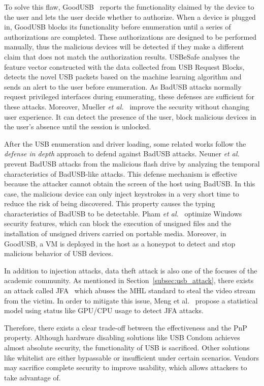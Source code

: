 To solve this flaw, GoodUSB~\cite{tian2015defending} reports the functionality claimed
by the device to the user and lets the user decide whether to authorize. When a device
is plugged in, GoodUSB blocks its functionality before enumeration until a
series of authorizations are completed. These authorizations are designed to be
performed manually, thus the malicious devices will be detected if they make a different claim 
that does not match the authorization results. 
USBeSafe\cite{usbesafe} analyses the 
feature vector constructed with the data collected from USB Request Blocks, 
detects the novel \ac{USB} packets based on the machine learning algorithm and sends 
an alert to the user before enumeration. As BadUSB attacks normally request privileged 
interfaces during enumerating, these defenses are sufficient for these attacks.
Moreover, Mueller \emph{et al.}~\cite{MuellerZN19} improve the security without changing user experience. It can detect the presence of the user, block malicious devices in the user's absence until the session is unlocked.


After the \ac{USB} enumeration and driver loading, some related works follow the \textit{defense in depth} approach to defend against BadUSB attacks.  
Neuner \emph{et al.}~\cite{neuner2018usblock}
prevent BadUSB attacks from the malicious flash drive by analyzing
the temporal characteristics of BadUSB-like attacks. This defense mechanism is
effective because the attacker cannot obtain the screen of the host using
BadUSB. In this case, the malicious device can only inject keystrokes in a very
short time to reduce the risk of being discovered. 
This property causes the
typing characteristics of BadUSB to be detectable. Pham \emph{et al.}~\cite{pham2010optimizing} optimize Windows security features, which can
block the execution of unsigned files and the installation of unsigned drivers
carried on portable media. Moreover, in GoodUSB, a VM is deployed in the host as
a honeypot to detect and stop malicious behavior of \ac{USB} devices.

In addition to injection attacks, data theft attack is also one of the focuses
of the academic community. As mentioned in Section~\ref{subsec:usb_attack}, there
exists an attack called JFA~\cite{JFC} which abuses the \ac{MHL}
standard to steal the video stream from the victim. In order to mitigate this
issue, Meng et al.~\cite{meng2018252} propose a statistical model using status
like GPU/CPU usage to detect JFA attacks.

Therefore, there exists a clear trade-off between the effectiveness and the
\ac{PnP} property. Although hardware disabling solutions like \ac{USB} Condom
achieves almost absolute security, the functionality of \ac{USB} is sacrificed.
Other solutions like whitelist are either bypassable or insufficient
under certain scenarios. Vendors may sacrifice complete security to
improve usability, which allows attackers to take advantage of.

